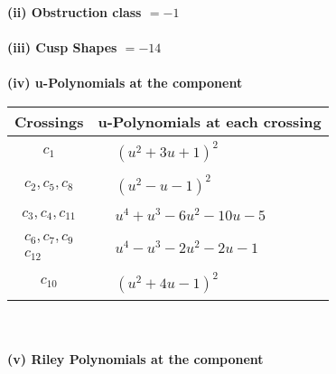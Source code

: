 \documentclass[1p]{elsarticle_modified}
\theoremstyle{definition}
\begin{document}
\flushleft \textbf{(ii) Obstruction class $= -1$}\\~\\
\flushleft \textbf{(iii) Cusp Shapes $= -14$}\\~\\
\newpage\renewcommand{\arraystretch}{1}
\flushleft \textbf{(iv) u-Polynomials at the component}\newline \\
\begin{tabular}{m{50pt}|m{274pt}}
Crossings & \hspace{64pt}u-Polynomials at each crossing \\
\hline $$\begin{aligned}c_{1}\end{aligned}$$&$\begin{aligned}
&(u^2+3 u+1)^2
\end{aligned}$\\
\hline $$\begin{aligned}c_{2},c_{5},c_{8}\end{aligned}$$&$\begin{aligned}
&(u^2- u-1)^2
\end{aligned}$\\
\hline $$\begin{aligned}c_{3},c_{4},c_{11}\end{aligned}$$&$\begin{aligned}
&u^4+u^3-6 u^2-10 u-5
\end{aligned}$\\
\hline $$\begin{aligned}c_{6},c_{7},c_{9}\\c_{12}\end{aligned}$$&$\begin{aligned}
&u^4- u^3-2 u^2-2 u-1
\end{aligned}$\\
\hline $$\begin{aligned}c_{10}\end{aligned}$$&$\begin{aligned}
&(u^2+4 u-1)^2
\end{aligned}$\\
\hline
\end{tabular}\\~\\
\newpage\renewcommand{\arraystretch}{1}
\flushleft \textbf{(v) Riley Polynomials at the component}\newline \\
\end{document}
